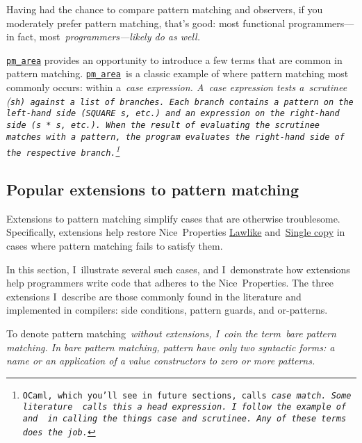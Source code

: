 \documentclass[manuscript,screen 12pt, nonacm]{acmart}
\begin{document}
    Having had the chance to compare pattern matching and observers, if you
    moderately prefer pattern matching, that's good: most functional
    programmers---in fact, most~\it{programmers}---likely do as well. 

    \hyperref[fig:pmarea]{\tt{pm\_area}} provides an opportunity to introduce a
    few terms that are common in pattern matching.
    \hyperref[fig:pmarea]{\tt{pm\_area}}~is a classic example of where pattern
    matching most commonly occurs: within a~\it{case} expression. A~\it{case}
    expression tests a~\it{scrutinee} (\tt{sh}) against a list of~\it{branches}.
    Each branch contains a pattern on the left-hand side (\tt{SQUARE s}, etc.)
    and an expression on the right-hand side (\tt{s * s}, etc.). When the result
    of evaluating the scrutinee matches with a pattern, the program evaluates
    the right-hand side of the respective branch.\footnote{OCaml, which you'll
    see in future sections, calls~\it{case}~\tt{match}. Some
    literature~\citep{guardproposal} calls this a~\it{head expression}. I~follow
    the example of~\citet{bpc} and~\citet{maranget} in calling the things
    \it{case} and~\it{scrutinee}. Any of these terms does the job.} 

\subsection{Popular extensions to pattern matching}
\label{extensions}

    Extensions to pattern matching simplify cases that are otherwise
    troublesome. Specifically, extensions help restore Nice~Properties
    \hyperref[p1]{Lawlike} and~\hyperref[p2]{Single copy} in cases where pattern
    matching fails to satisfy them. 
    
    In this section, I~illustrate several such cases, and I~demonstrate how
    extensions help programmers write code that adheres to the Nice~Properties.
    The three extensions I~describe are those commonly found in the literature
    and implemented in compilers: side conditions, pattern guards, and
    or-patterns. 
    
    To denote pattern matching~\it{without} extensions, I~coin the term~\it{bare
    pattern matching}. In bare pattern matching, pattern have only two syntactic
    forms: a name or an application of a value constructors to zero or more
    patterns. 


\end{document}
